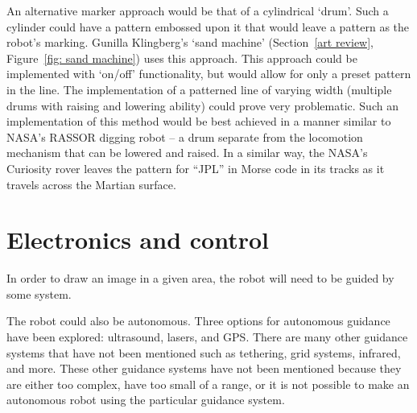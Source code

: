         An alternative marker approach would be that of a cylindrical `drum'. Such a cylinder could have a pattern embossed upon it that would leave a pattern as the robot's marking. Gunilla Klingberg's `sand machine' (Section~\ref{art review}, Figure~\ref{fig: sand machine}) uses this approach. This approach could be implemented with `on/off' functionality, but would allow for only a preset pattern in the line. The implementation of a patterned line of varying width (\eg multiple drums with raising and lowering ability) could prove very problematic. Such an implementation of this method would be best achieved in a manner similar to NASA's RASSOR digging robot -- a drum separate from the locomotion mechanism that can be lowered and raised.\cite{Siceloff2013} In a similar way, the NASA's Curiosity rover leaves the pattern for ``JPL'' in Morse code in its tracks as it travels across the Martian surface.

\section{Electronics and control}\label{outline: electronics and control}
    \label{outline:guidance}
        In order to draw an image in a given area, the robot will need to be guided by some system. 

        The robot could also be autonomous. Three options for autonomous guidance have been explored: ultrasound, lasers, and \gls{GPS}. There are many other guidance systems that have not been mentioned such as tethering, grid systems, infrared, and more. These other guidance systems have not been mentioned because they are either too complex, have too small of a range, or it is not possible to make an autonomous robot using the particular guidance system.

